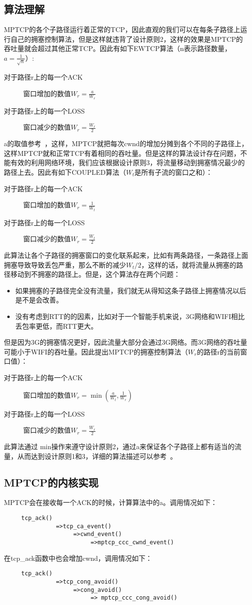 \subsection{算法理解}
MPTCP的各个子路径运行着正常的TCP，因此直观的我们可以在每条子路径上运行自己的拥塞控制算法，但是这样就违背了设计原则2，这样的效果是MPTCP的吞吐量就会超过其他正常TCP。因此有如下EWTCP算法（n表示路径数量，$a=\frac{1}{\sqrt{n}}$）:
\begin{description}
  \item[对于路径r上的每一个ACK] 窗口增加的数值$W_r=\frac{a}{W_r}$
  \item[对于路径r上的每一个LOSS] 窗口减少的数值$W_r=\frac{W_r}{2}$
\end{description}
a的取值参考~\cite{Honda2009Multipath}，这样，MPTCP就把每次cwnd的增加分摊到各个不同的子路径上，这样MPTCP就和正常TCP有着相同的吞吐量。但是这样的算法设计存在问题，不能有效的利用网络环境，我们应该根据设计原则3，将流量移动到拥塞情况最少的路径上去。因此有如下COUPLED算法（$W_t$是所有子流的窗口之和）：
\begin{description}
  \item[对于路径r上的每一个ACK] 窗口增加的数值$W_r=\frac{1}{W_t}$
  \item[对于路径r上的每一个LOSS] 窗口减少的数值$W_r=\frac{W_t}{2}$
\end{description}
此算法让各个子路径的拥塞窗口的变化联系起来，比如有两条路径，一条路径上面拥塞导致导致丢包严重，那么不断的减少$W_t/2$，这样的话，就将流量从拥塞的路径移动到不拥塞的路径上。但是，这个算法存在两个问题：
\begin{itemize}
  \item 如果拥塞的子路径完全没有流量，我们就无从得知这条子路径上拥塞情况以后是不是会改善。
  \item 没有考虑到RTT的的因素，比如对于一个智能手机来说，3G网络和WIFI相比丢包率更低，而RTT更大。
\end{itemize}
但是因为3G的拥塞情况更好，因此流量大部分会通过3G网络。而3G网络的吞吐量可能小于WIFI的吞吐量。因此提出MPTCP的拥塞控制算法（$W_r$的路径r的当前窗口值）：
\begin{description}
  \item[对于路径r上的每一个ACK] 窗口增加的数值$W_r=\min(\frac{a}{W_t},\frac{1}{W_r})$
  \item[对于路径r上的每一个LOSS] 窗口减少的数值$W_r=\frac{W_r}{2}$
\end{description}
此算法通过 min操作来遵守设计原则2，通过a来保证各个子路径上都有适当的流量，从而达到设计原则1和3，详细的算法描述可以参考~\cite{Wischik2011Design}。
\subsection{MPTCP的内核实现}
MPTCP会在接收每一个ACK的时候，计算算法中的a。调用情况如下：
\small\begin{verbatim}
     tcp_ack()
               =>tcp_ca_event()
                    =>cwnd_event()
                         =>mptcp_ccc_cwnd_event()
\end{verbatim}\normalsize

在tcp\_ack函数中也会增加cwnd，调用情况如下：
\small\begin{verbatim}
     tcp_ack()
               =>tcp_cong_avoid()
                    =>cong_avoid()
                         => mptcp_ccc_cong_avoid()
\end{verbatim}\normalsize
